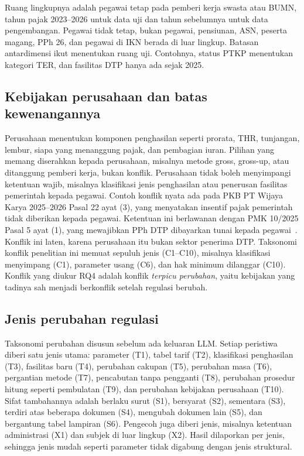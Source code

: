 \documentclass[journal,a4paper]{IEEEtran}
\makeatletter
\DeclareRobustCommand{\en}[1]{{\usefont{\f@encoding}{\f@family}{\f@series}{it}#1\/}}
\makeatother
\begin{document}
Ruang lingkupnya adalah pegawai tetap pada pemberi kerja swasta atau BUMN, tahun pajak 2023--2026 untuk data uji dan tahun sebelumnya untuk data pengembangan. Pegawai tidak tetap, bukan pegawai, pensiunan, ASN, peserta magang, PPh 26, dan pegawai di IKN berada di luar lingkup. Batasan antardimensi ikut menentukan ruang uji. Contohnya, status PTKP menentukan kategori TER, dan fasilitas DTP hanya ada sejak 2025.

\subsection{Kebijakan perusahaan dan batas kewenangannya}
Perusahaan menentukan komponen penghasilan seperti prorata, THR, tunjangan, lembur, siapa yang menanggung pajak, dan pembagian iuran. Pilihan yang memang diserahkan kepada perusahaan, misalnya metode \en{gross}, \en{gross-up}, atau ditanggung pemberi kerja, bukan konflik. Perusahaan tidak boleh menyimpangi ketentuan wajib, misalnya klasifikasi jenis penghasilan atau penerusan fasilitas pemerintah kepada pegawai. Contoh konflik nyata ada pada PKB PT Wijaya Karya 2025--2026 Pasal 22 ayat (3), yang menyatakan insentif pajak pemerintah tidak diberikan kepada pegawai. Ketentuan ini berlawanan dengan PMK 10/2025 Pasal 5 ayat (1), yang mewajibkan PPh DTP dibayarkan tunai kepada pegawai~\cite{pmk10_2025}. Konflik ini laten, karena perusahaan itu bukan sektor penerima DTP. Taksonomi konflik penelitian ini memuat sepuluh jenis (C1--C10), misalnya klasifikasi menyimpang (C1), parameter usang (C6), dan hak minimum dilanggar (C10). Konflik yang diukur RQ4 adalah konflik \emph{terpicu perubahan}, yaitu kebijakan yang tadinya sah menjadi berkonflik setelah regulasi berubah.

\subsection{Jenis perubahan regulasi}
\label{subsec:jenis-perubahan}
Taksonomi perubahan disusun sebelum ada keluaran LLM. Setiap peristiwa diberi satu jenis utama: parameter (T1), tabel tarif (T2), klasifikasi penghasilan (T3), fasilitas baru (T4), perubahan cakupan (T5), perubahan masa (T6), pergantian metode (T7), pencabutan tanpa pengganti (T8), perubahan prosedur hitung seperti pembulatan (T9), dan perubahan kebijakan perusahaan (T10). Sifat tambahannya adalah berlaku surut (S1), bersyarat (S2), sementara (S3), terdiri atas beberapa dokumen (S4), mengubah dokumen lain (S5), dan bergantung tabel lampiran (S6). Pengecoh juga diberi jenis, misalnya ketentuan administrasi (X1) dan subjek di luar lingkup (X2). Hasil dilaporkan per jenis, sehingga jenis mudah seperti parameter tidak digabung dengan jenis struktural.
\end{document}

